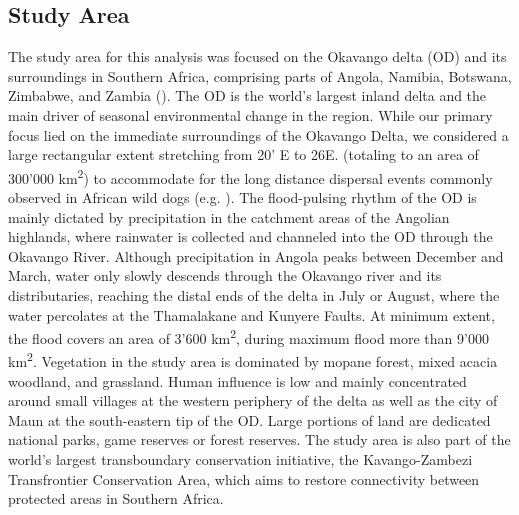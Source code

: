 \documentclass[abstract=on,10pt,a4paper,bibliography=totocnumbered]{article}
\begin{document}
\subsection{Study Area}
The study area for this analysis was focused on the Okavango delta (OD) and its
surroundings in Southern Africa, comprising parts of Angola, Namibia, Botswana,
Zimbabwe, and Zambia (). The OD is the world's largest inland
delta and the main driver of seasonal environmental change in the region. While
our primary focus lied on the immediate surroundings of the Okavango Delta, we
considered a large rectangular extent stretching from 20' E to
26\degree E. (totaling to an area of 300'000 km\textsuperscript{2}) to
accommodate for the long distance dispersal events commonly observed in African
wild dogs (e.g. \citealp{Davies-Mostert.2012, Masenga.2016, Cozzi.2020}). The
flood-pulsing rhythm of the OD is mainly dictated by precipitation in the
catchment areas of the Angolian highlands, where rainwater is collected and
channeled into the OD through the Okavango River. Although precipitation in
Angola peaks between December and March, water only slowly descends through the
Okavango river and its distributaries, reaching the distal ends of the delta in
July or August, where the water percolates at the Thamalakane and Kunyere
Faults. At minimum extent, the flood covers an area of 3'600
km\textsuperscript{2}, during maximum flood more than 9'000
km\textsuperscript{2}. Vegetation in the study area is dominated by mopane
forest, mixed acacia woodland, and grassland. Human influence is low and mainly
concentrated around small villages at the western periphery of the delta as well
as the city of Maun at the south-eastern tip of the OD. Large portions of land
are dedicated national parks, game reserves or forest reserves. The study area
is also part of the world's largest transboundary conservation initiative, the
Kavango-Zambezi Transfrontier Conservation Area, which aims to restore
connectivity between protected areas in Southern Africa.
\end{document}
